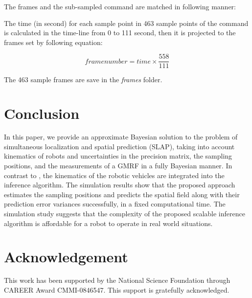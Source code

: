 \documentclass[letterpaper, 10 pt, conference]{ieeeconf}
\newcommand{\Cov}{\operatorname{Cov}}
\newcommand{\f}[2]{f_{#1}\left(#2\right)}
\begin{document}
The frames and the sub-sampled command are matched in following manner:

The time (in second) for each sample point in 463 sample points of the command is calculated in the time-line from 0 to 111 second, then it is projected to the frames set by following equation:

\begin{equation}
frame number=time\times\frac{558}{111}
\end{equation}  

The 463 sample frames are save in the \emph{frames} folder.



\section{Conclusion}
In this paper, we provide an approximate Bayesian solution to the problem of simultaneous localization and spatial prediction (SLAP), taking into account kinematics of robots and uncertainties in the precision matrix, the sampling positions, and the measurements of a GMRF in a fully Bayesian manner. In contrast to \cite{jadaliha2012efficient}, the kinematics of the robotic vehicles are integrated into the inference algorithm. The simulation results show that the proposed approach estimates the sampling positions and predicts the spatial field along with their prediction error variances successfully, in a fixed computational time.
The simulation study suggests that the complexity of the proposed scalable inference algorithm is affordable for a robot to operate in real world situations.


\section{Acknowledgement}
This work has been supported by the National Science Foundation through CAREER Award
CMMI-0846547. This support is gratefully acknowledged.

%
%


 
\end{document}
